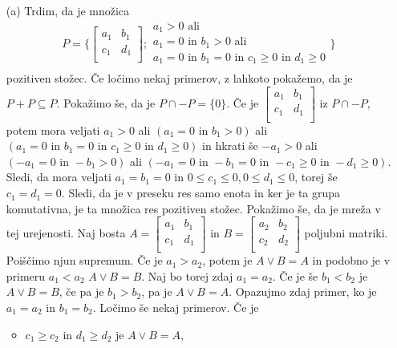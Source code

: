 \documentclass[a4paper, 12pt]{article}
\begin{document}
\begin{enumerate}
\item[(a)]Trdim, da je množica
$$
P=\big\{
\begin{bmatrix}
a_1 & b_1 \\
c_1 & d_1 \\
\end{bmatrix}
;
\begin{array}{l}
a_1 >0 \text{ ali}\\
a_1 = 0 \text{ in } b_1 > 0 \text{ ali}\\
a_1 = 0 \text{ in } b_1 = 0 \text{ in } c_1 \ge 0 \text{ in } d_1 \ge 0\\
\end{array}
\big\}
$$
pozitiven stožec. Če ločimo nekaj primerov, z lahkoto pokažemo, da je $P+P \subseteq P$. Pokažimo še, da je $P\cap -P = \{0\}$. Če je 
$\begin{bmatrix}
a_1 & b_1 \\
c_1 & d_1\\
\end{bmatrix}
$
iz $P\cap -P$, potem mora veljati $a_1 > 0$ ali $(a_1 = 0 \text{ in } b_1 > 0)$ ali $(a_1=0 \text{ in } b_1 = 0 \text{ in } c_1 \ge 0 \text{ in } d_1 \ge 0)$ in hkrati še  $-a_1 > 0$ ali $(-a_1 = 0 \text{ in } -b_1 > 0)$ ali $(-a_1=0 \text{ in } -b_1 = 0 \text{ in } -c_1 \ge 0 \text{ in } -d_1 \ge 0)$. Sledi, da mora veljati $a_1 =b_1 =0$ in $0\le c_1 \le 0, 0 \le d_1 \le 0$, torej še $c_1 = d_1 = 0$. Sledi, da je v preseku res samo enota in ker je ta grupa komutativna, je ta množica res pozitiven stožec. 
Pokažimo še, da je mreža v tej urejenosti. Naj bosta 
$
A=
\begin{bmatrix}
a_1 & b_1 \\
c_1 & d_1 \\
\end{bmatrix}
$
in
$
B = 
\begin{bmatrix}
a_2 & b_2 \\
c_2 & d_2 \\
\end{bmatrix}
$
poljubni matriki. Poiščimo njun supremum. Če je $a_1 > a_2 $, potem je $A \lor B = A$ in podobno  je v primeru  $a_1 < a_2$ $A\lor B = B$. Naj bo torej zdaj $a_1 = a_2$. Če je še $ b_1 < b_2 $ je $A\lor B = B$, če pa je $b_1 > b_2$, pa je $A \lor B = A$. Opazujmo zdaj primer, ko je $a_1 = a_2 $ in $b_1 = b_2$. Ločimo še nekaj primerov. Če je 
\begin{itemize}
\item $c_1 \ge c_2 $ in $d_1\ge d_2$ je $A\lor B = A$,

\end{itemize}
\end{enumerate}
\end{document}
